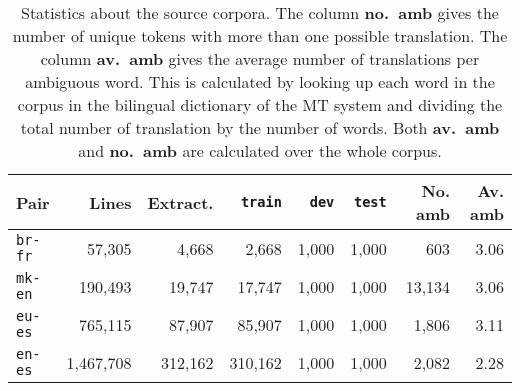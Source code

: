 \documentclass[11pt]{article}
\begin{document}
\begin{table*}
\begin{center}
 \begin{tabular}{|l|r|r||r|r|r|r|r|}
    \hline  
    {\bf Pair}      & {\bf Lines} & {\bf Extract.} & \texttt{train} & \texttt{dev} & \texttt{test} & {\bf No. amb} & {\bf Av. amb} \\ 
    \hline  
     \texttt{br-fr} & 57,305  & 4,668 & 2,668 & 1,000 & 1,000  & 603  & 3.06 \\
    \hline  
     \texttt{mk-en} & 190,493  & 19,747  & 17,747  & 1,000 & 1,000 & 13,134  & 3.06  \\
    \hline
     \texttt{eu-es} & 765,115  & 87,907  & 85,907  & 1,000 & 1,000 & 1,806  & 3.11 \\
    \hline
     \texttt{en-es} & 1,467,708 & 312,162 & 310,162 & 1,000 & 1,000 & 2,082  & 2.28 \\
    \hline  
 \end{tabular}
 \caption{Statistics about the source corpora. The column {\bf no.\ amb} gives the number of
   unique tokens with more than one possible translation. The column
   {\bf av.\ amb} gives the average number of translations per ambiguous
   word. This is calculated by looking up each word in the corpus in
   the bilingual dictionary of the MT system and dividing the total
   number of translation by the number of words. Both {\bf av.\ amb}
   and {\bf no.\ amb} are calculated over the whole corpus.}
 \label{table:input-corp}
\end{center}
\end{table*}

\end{document}
